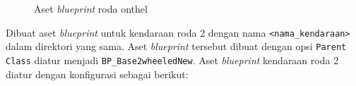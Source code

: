 \begin{figure}[!ht]
    \centering
    \hfill
    \caption{Aset \textit{blueprint} roda onthel}
    \label{fig:onthel-wheel-blueprints}
\end{figure}

Dibuat aset \textit{blueprint} untuk kendaraan roda 2 dengan nama
\verb|<nama_kendaraan>| dalam direktori yang sama. Aset \textit{blueprint}
tersebut dibuat dengan opsi \verb|Parent Class| diatur menjadi
\verb|BP_Base2wheeledNew|. Aset \textit{blueprint} kendaraan roda 2
diatur dengan konfigurasi sebagai berikut:

